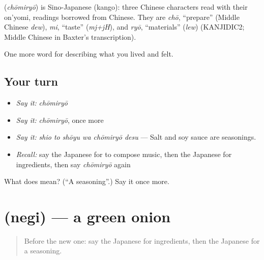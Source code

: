 \begin{cousinweb}
\textbf{} (\emph{chōmiryō}) is Sino-Japanese (kango): three Chinese characters read with their on'yomi, readings borrowed from Chinese. They are \emph{chō}, \textquotedblleft{}prepare\textquotedblright{} (Middle Chinese \emph{dew}), \emph{mi}, \textquotedblleft{}taste\textquotedblright{} (\emph{mj+jH}), and \emph{ryō}, \textquotedblleft{}materials\textquotedblright{} (\emph{lew}) (KANJIDIC2; Middle Chinese in Baxter's transcription).
\end{cousinweb}

\begin{grammarlens}[title={What you've built}]
One more word for describing what you lived and felt.
\end{grammarlens}

\subsection*{Your turn}
\begin{itemize}
\raggedright
  \item \emph{Say it:} \emph{chōmiryō}
  \item \emph{Say it:} \emph{chōmiryō}, once more
  \item \emph{Say it:} \emph{shio to shōyu wa chōmiryō desu} — Salt and soy sauce are seasonings.
  \item \emph{Recall:} say the Japanese for to compose music, then the Japanese for ingredients, then say \emph{chōmiryō} again
\end{itemize}

\begin{tcolorbox}[breakable,colback=teal!4,colframe=teal!35!black,title={Before you move on}]
What does  mean? (\textquotedblleft{}A seasoning\textquotedblright{}.) Say it once more.
\end{tcolorbox}
\section[\texorpdfstring{\ja{ねぎ} (negi)}{ねぎ (negi)}]{ (negi) — a green onion}

\label{lesson:JA-C472-negi}



\begin{quote}
Before the new one: say the Japanese for ingredients, then the Japanese for a seasoning.
\end{quote}


